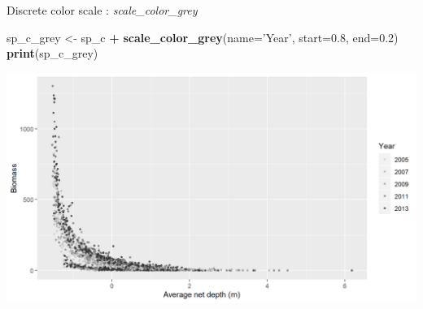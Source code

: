 \documentclass[
  ignorenonframetext,
]{beamer}
\newenvironment{Shaded}{\begin{snugshade}}{\end{snugshade}}
\newcommand{\DataTypeTok}[1]{\textcolor[rgb]{0.13,0.29,0.53}{#1}}
\newcommand{\FloatTok}[1]{\textcolor[rgb]{0.00,0.00,0.81}{#1}}
\newcommand{\KeywordTok}[1]{\textcolor[rgb]{0.13,0.29,0.53}{\textbf{#1}}}
\newcommand{\NormalTok}[1]{#1}
\newcommand{\OperatorTok}[1]{\textcolor[rgb]{0.81,0.36,0.00}{\textbf{#1}}}
\newcommand{\StringTok}[1]{\textcolor[rgb]{0.31,0.60,0.02}{#1}}
\begin{document}
\begin{frame}[fragile]{Discrete color scale : \emph{scale\_color\_grey}}
\protect\hypertarget{discrete-color-scale-scale_color_grey-1}{}

\begin{Shaded}
\begin{Highlighting}[]
\NormalTok{sp_c_grey <-}\StringTok{ }\NormalTok{sp_c }\OperatorTok{+}
\StringTok{  }\KeywordTok{scale_color_grey}\NormalTok{(}\DataTypeTok{name=}\StringTok{'Year'}\NormalTok{, }\DataTypeTok{start=}\FloatTok{0.8}\NormalTok{, }\DataTypeTok{end=}\FloatTok{0.2}\NormalTok{)}
\KeywordTok{print}\NormalTok{(sp_c_grey)}
\end{Highlighting}
\end{Shaded}

\begin{center}\includegraphics[width=0.8\linewidth]{figure/sp_discrete_color6-1} \end{center}

\end{frame}
\end{document}
